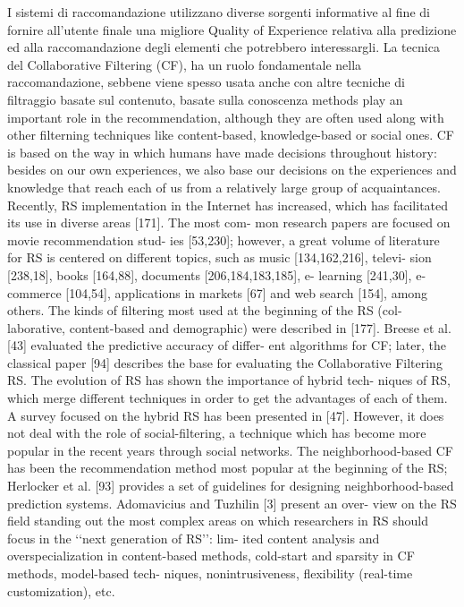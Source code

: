 \documentclass[11pt]{article}
\begin{document}
I sistemi di raccomandazione utilizzano diverse sorgenti informative al fine di fornire all'utente finale una migliore Quality of Experience relativa alla predizione ed alla raccomandazione degli elementi che potrebbero interessargli. La tecnica del Collaborative Filtering (CF), ha un ruolo fondamentale nella raccomandazione, sebbene viene spesso usata anche con altre tecniche di filtraggio basate sul contenuto, basate sulla conoscenza methods play
an important role in the recommendation, although they are often
used along with other filterning techniques like content-based,
knowledge-based or social ones.
CF is based on the way in which humans have made decisions
throughout history: besides on our own experiences, we also base
our decisions on the experiences and knowledge that reach each of
us from a relatively large group of acquaintances.
Recently, RS implementation in the Internet has increased,
which has facilitated its use in diverse areas [171]. The most com-
mon research papers are focused on movie recommendation stud-
ies [53,230]; however, a great volume of literature for RS is
centered on different topics, such as music [134,162,216], televi-
sion [238,18], books [164,88], documents [206,184,183,185], e-
learning [241,30], e-commerce [104,54], applications in markets
[67] and web search [154], among others.
The kinds of filtering most used at the beginning of the RS (col-
laborative, content-based and demographic) were described in
[177]. Breese et al. [43] evaluated the predictive accuracy of differ-
ent algorithms for CF; later, the classical paper [94] describes the
base for evaluating the Collaborative Filtering RS.
The evolution of RS has shown the importance of hybrid tech-
niques of RS, which merge different techniques in order to get
the advantages of each of them. A survey focused on the hybrid
RS has been presented in [47]. However, it does not deal with
the role of social-filtering, a technique which has become more
popular in the recent years through social networks.
The neighborhood-based CF has been the recommendation
method most popular at the beginning of the RS; Herlocker et al.
[93] provides a set of guidelines for designing neighborhood-based
prediction systems. Adomavicius and Tuzhilin [3] present an over-
view on the RS field standing out the most complex areas on which researchers in RS should focus in the ‘‘next generation of RS’’: lim-
ited content analysis and overspecialization in content-based
methods, cold-start and sparsity in CF methods, model-based tech-
niques, nonintrusiveness, flexibility (real-time customization), etc.
\end{document}
